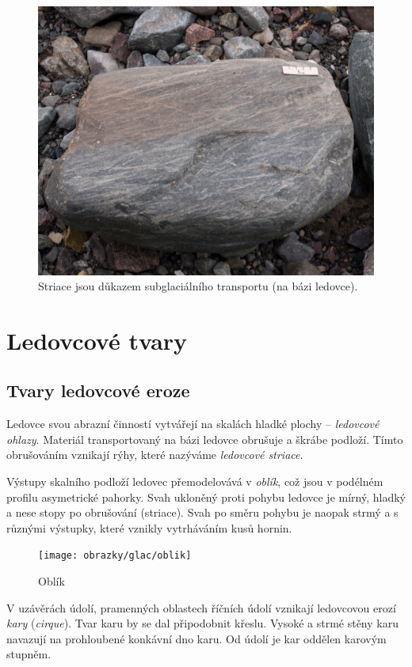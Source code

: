 \begin{figure}
	\centering
	\includegraphics[width=1\linewidth]{obrazky/glac/striace}
	\caption{Striace jsou důkazem subglaciálního transportu (na bázi ledovce).}
	\label{fig:striace}
\end{figure}


\section{Ledovcové tvary}
\subsection{Tvary ledovcové eroze}
Ledovce svou abrazní činností vytvářejí na skalách hladké plochy -- \emph{ledovcové ohlazy}. Materiál transportovaný na bázi ledovce obrušuje a škrábe podloží. Tímto obrušováním vznikají rýhy, které nazýváme \emph{ledovcové striace}. 

Výstupy skalního podloží ledovec přemodelovává v \emph{oblík}, což jsou v podélném profilu asymetrické pahorky. Svah ukloněný proti pohybu ledovce je mírný, hladký a nese stopy po obrušování (striace). Svah po směru pohybu je naopak strmý a s různými výstupky, které vznikly vytrháváním kusů hornin. 

\begin{figure}
	\centering
	\texttt{[image: obrazky/glac/oblik]}
	\caption{Oblík}
	\label{fig:oblik}
\end{figure}

V uzávěrách údolí, pramenných oblastech říčních údolí vznikají ledovcovou erozí \emph{kary} (\textit{cirque}). Tvar karu by se dal připodobnit křeslu. Vysoké a strmé stěny karu navazují na prohloubené konkávní dno karu. Od údolí je kar oddělen karovým stupněm.

